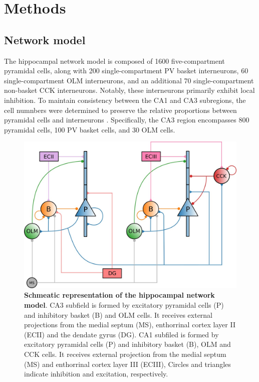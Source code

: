 \documentclass[../main.tex]{subfiles}
\begin{document}
\section{Methods}

\subsection{Network model}
The hippocampal network model is composed of 1600 five-compartment pyramidal cells, along with 200 single-compartment PV basket interneurons, 60 single-compartment OLM interneurons, and an additional 70 single-compartment non-basket CCK interneurons. 
Notably, these interneurons primarily exhibit local inhibition. 
To maintain consistency between the CA1 and CA3 subregions, the cell numnbers were determined to preserve the relative proportions between pyramidal cells and interneurons \citep{bezaire_interneuronal_2016,gandolfi_full-scale_2023}.
Specifically, the CA3 region encompasses 800 pyramidal cells, 100 PV basket cells, and 30 OLM cells.
\begin{figure}[!htb]
    \centering
    \includegraphics[width=\textwidth]{chapter4/figures/hippocampus_network.jpeg}
    \caption{\textbf{Schmeatic representation of the hippocampal network model}.
    CA3 subfield is formed by excitatory pyramidal cells (P) and inhibitory basket (B) and OLM cells.
    It receives external projections from the medial septum (MS), enthorrinal cortex layer II (ECII) and the dendate gyrus (DG).
    CA1 subfiled is formed by excitatory pyramidal cells (P) and inhibitory basket (B), OLM and CCK cells.
    It receives external projection from the medial septum (MS) and enthorrinal cortex layer III (ECIII),
    Circles and triangles indicate inhibition and excitation, respectively.}
    \label{fig:network-model}
\end{figure}
\end{document}
